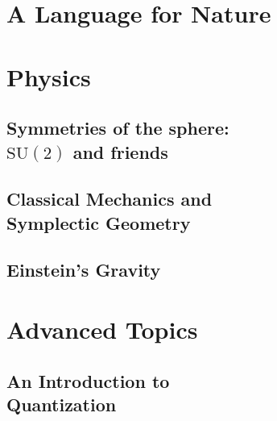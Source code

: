 \documentclass[12pt, twoside, openany]{book}
\newcommand{\1}{\mathbbm{1}}
\theoremstyle{definition}
\begin{document}
\part{A Language for Nature}\thispagestyle{empty}

%







\part{Physics}\thispagestyle{empty}

\chapter[Symmetries of the sphere: $\mathrm{SU}(2)$ and friends]{Symmetries of the sphere: \\$\mathrm{SU}(2)$ and friends}

\chapter[Classical Mechanics and Symplectic Geometry]{Classical Mechanics and\\ Symplectic Geometry}\label{ch:Symplectic}

\chapter{Einstein's Gravity}\label{ch:GR}

\part{Advanced Topics}\thispagestyle{empty}

\chapter[An Introduction to Quantization]{An Introduction to \\Quantization}
\end{document}
